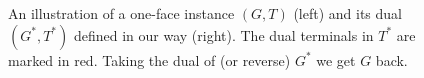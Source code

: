 \begin{figure}[h]
	\centering
	\subfigure%
	{}
	\hspace{0.7cm}
	\subfigure%
	{
		}
	\caption{An illustration of a one-face instance $(G,T)$ (left) and its dual $(G^*,T^*)$ defined in our way (right). The dual terminals in $T^*$ are marked in red. Taking the dual of (or reverse) $G^*$ we get $G$ back.\label{fig: dual}}
\end{figure}



